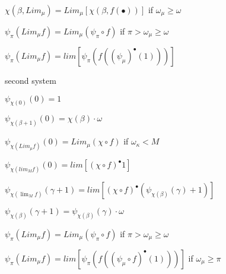 \documentclass[10pt]{article}
\begin{document}
\( \chi(\beta,Lim_\mu) = Lim_\mu [\chi(\beta,f(\bullet))] \) if \( \omega_\mu \ge \omega \)

\( \psi_\pi(Lim_\mu f) = Lim_\mu (\psi_\pi \circ f) \) if \( \pi > \omega_\mu \ge \omega \)

\( \psi_\pi(Lim_\mu f) = lim [ \psi_\pi(f((\psi_\mu)^\bullet(1))) ] \)


second system

\( \psi_{\chi(0)}(0) = 1 \)

\( \psi_{\chi(\beta+1)}(0) = \chi(\beta) \cdot \omega \)

\( \psi_{\chi(Lim_\mu f)}(0) = Lim_\mu(\chi \circ f) \) if \( \omega_\kappa < M \)

\( \psi_{\chi(lim_M f)}(0) = lim [(\chi \circ f)^\bullet 1] \)

\( \psi_{\chi(\lim_M f)}(\gamma+1) = lim [(\chi \circ f)^\bullet (\psi_{\chi(\beta)}(\gamma)+1)] \)

\( \psi_{\chi(\beta)}(\gamma+1) = \psi_{\chi(\beta)}(\gamma) \cdot \omega \)

\( \psi_\pi (Lim_\mu f) = Lim_\mu (\psi_\pi \circ f) \) if \( \pi > \omega_\mu \ge \omega \)

\( \psi_\pi (Lim_\mu f) = lim [\psi_\pi(f((\psi_\mu \circ f)^\bullet(1)))] \) if \( \omega_\mu \ge \pi \)
\end{document}
